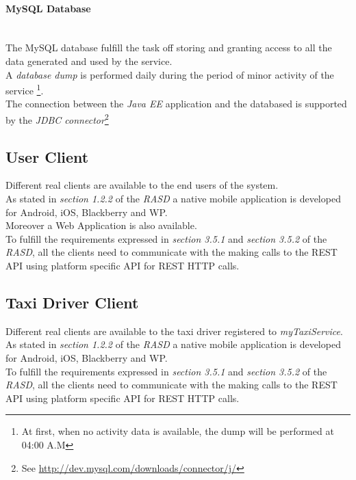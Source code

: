 \paragraph{MySQL Database} %
\label{par:mysql_database}\hfill \\
The MySQL database fulfill the task off storing and granting access to all the data generated and used by the service.\\
A \emph{database dump} is performed daily during the period of minor activity of the service \footnote{At first, when no activity data is available, the dump will be performed at 04:00 A.M}.\\
The connection between the \emph{Java EE} application and the databased is supported by the \emph{JDBC connector}\footnote{See \url{http://dev.mysql.com/downloads/connector/j/}}\\


\subsection{User Client} %
\label{sub:user_client}
Different real clients are available to the end users of the system.\\
As stated in \emph{section 1.2.2} of the \emph{RASD} a native mobile application is developed for Android, iOS, Blackberry and WP.\\
Moreover a Web Application is also available.\\
To fulfill the requirements expressed in \emph{section 3.5.1} and \emph{section 3.5.2} of the \emph{RASD}, all the clients need to communicate with the  making calls to the REST API using platform specific API for REST HTTP calls.


\subsection{Taxi Driver Client} %
\label{sub:taxi_driver_client}
Different real clients are available to the taxi driver registered to \emph{myTaxiService}.\\
As stated in \emph{section 1.2.2} of the \emph{RASD} a native mobile application is developed for Android, iOS, Blackberry and WP.\\
To fulfill the requirements expressed in \emph{section 3.5.1} and \emph{section 3.5.2} of the \emph{RASD}, all the clients need to communicate with the  making calls to the REST API using platform specific API for REST HTTP calls.
